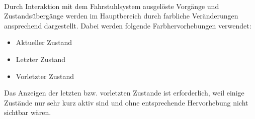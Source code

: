 \paragraph{}Durch Interaktion mit dem Fahrstuhlsystem ausgelöste Vorgänge und Zustandsübergänge werden im Hauptbereich  durch farbliche Veränderungen ansprechend dargestellt. Dabei werden folgende Farbhervorhebungen verwendet:

\begin{itemize}
	\item {} Aktueller Zustand
	\item {} Letzter Zustand
	\item {} Vorletzter Zustand
\end{itemize}

Das Anzeigen der letzten bzw. vorletzten Zustande ist erforderlich, weil einige Zustände nur sehr kurz aktiv sind und ohne entsprechende Hervorhebung nicht sichtbar wären.